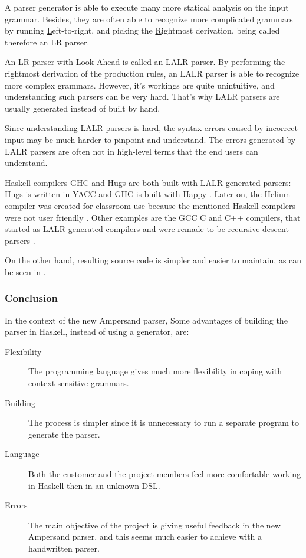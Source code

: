 %
A parser generator is able to execute many more statical analysis on the input grammar.
Besides, they are often able to recognize more complicated grammars by running \underline{L}eft-to-right, and picking the \underline{R}ightmost derivation, being called therefore an LR parser.

%
An LR parser with \underline{L}ook-\underline{A}head is called an LALR parser.
By performing the rightmost derivation of the production rules, an LALR parser is able to recognize more complex grammars.
However, it's workings are quite unintuitive, and understanding such parsers can be very hard.
That's why LALR parsers are usually generated instead of built by hand.

Since understanding LALR parsers is hard, the syntax errors caused by incorrect input may be much harder to pinpoint and understand.
The errors generated by LALR parsers are often not in high-level terms that the end users can understand.

%
%
%
%
%
Haskell compilers GHC and Hugs are both built with LALR generated parsers: Hugs is written in YACC \cite{hugs-parser} and GHC is built with Happy \cite{ghc-parser}.
Later on, the Helium compiler was created for classroom-use because the mentioned Haskell compilers were not user friendly \cite{helium-parser}.
Other examples are the GCC C and C++ compilers, that started as LALR generated compilers and were remade to be recursive-descent parsers \cite{gcc-c-parser} \cite{gcc-cpp-parser}.

On the other hand, resulting source code is simpler and easier to maintain, as can be seen in \cite{parser-examples}.

\subsubsection{Conclusion}
In the context of the new Ampersand parser, Some advantages of building the parser in Haskell, instead of using a generator, are:
\begin{description}
	\item[Flexibility] The programming language gives much more flexibility in coping with context-sensitive grammars.
	\item[Building] The process is simpler since it is unnecessary to run a separate program to generate the parser.
	\item[Language] Both the customer and the project members feel more comfortable working in Haskell then in an unknown DSL.
	\item[Errors] The main objective of the project is giving useful feedback in the new Ampersand parser, and this seems much easier to achieve with a handwritten parser.
\end{description}

